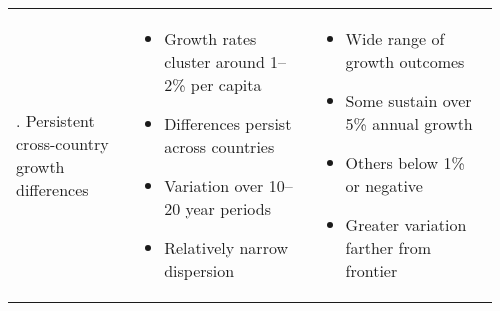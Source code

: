 \begin{landscape}
\begin{longtable}{>{\RaggedRight}p{0.24\linewidth}
        >{\RaggedRight}p{0.36\linewidth}
        >{\RaggedRight\arraybackslash}p{0.36\linewidth}}
        6. Persistent cross-country growth differences &
        \vspace{-0.5\baselineskip}\begin{itemize}[leftmargin=*, topsep=0pt, itemsep=2pt, parsep=0pt, partopsep=0pt]
            \item Growth rates cluster around 1--2\% per capita
            \item Differences persist across countries
            \item Variation over 10--20 year periods
            \item Relatively narrow dispersion
        \end{itemize}\vspace{-0.3\baselineskip} &
        \vspace{-0.5\baselineskip}\begin{itemize}[leftmargin=*, topsep=0pt, itemsep=2pt, parsep=0pt, partopsep=0pt]
            \item Wide range of growth outcomes
            \item Some sustain over 5\% annual growth
            \item Others below 1\% or negative
            \item Greater variation farther from frontier
        \end{itemize}\vspace{-0.3\baselineskip}
        \\
    \end{longtable}
    \endgroup
\end{landscape}

\pagestyle{fancy}